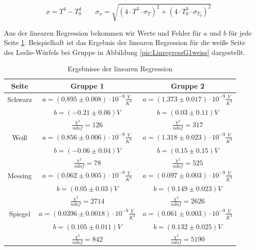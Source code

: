 \documentclass[a4paper, 11pt]{article}
\begin{document}
\begin{equation}
x=T^4-T_0^4
\qquad
\sigma_x = \sqrt{(4 \cdot T^3 \cdot\sigma_T)^2+(4\cdot T_0^3\cdot \sigma_{T_0})^2} 
\end{equation}

Aus der linearen Regression bekommen wir Werte und Fehler für $a$ und $b$ für jede Seite \ref{table:ErgebnisseLinregress}.
Beispielhaft ist das Ergebnis der linearen Regression für die weiße Seite des Leslie-Würfels bei Gruppe in Abbildung \ref{pic:LinregressG1weiss} dargestellt.

\begin{table}[H]
\Large
\centering
	\begin{tabular}{|c|c|c|}
	\hline Seite & Gruppe 1& Gruppe 2 \\
	\hline Schwarz& $a=( 0.895\pm 0.008)\cdot 10^{-9}\frac{V}{K^4} $ &  $a=( 1.373\pm 0.017 )\cdot 10^{-9}\frac{V}{K^4}$\\
	         $ $  & $b=(-0.21 \pm 0.06)V $ &  $b=( 0.03\pm 0.11)V $\\
	$ $  & $\frac{\chi^2}{ndof}=126$ &  $\frac{\chi^2}{ndof}=317$\\
	\hline Weiß& $a=( 0.856\pm 0.006)\cdot 10^{-9}\frac{V}{K^4} $ &  $a=(1.318 \pm 0.023)\cdot 10^{-9}\frac{V}{K^4}$\\
	     $ $       & $b=(-0.06 \pm 0.04)V $ &  $b=(0.15\pm 0.15)V $\\
	$ $  & $\frac{\chi^2}{ndof}=78$ &  $\frac{\chi^2}{ndof}=525$\\
	\hline Messing& $a=(0.062 \pm 0.005)\cdot 10^{-9}\frac{V}{K^4} $ &  $a=( 0.097\pm 0.003)\cdot 10^{-9}\frac{V}{K^4}$\\
	     $ $       & $b=(0.05 \pm 0.03)V $ &  $b=(0.149 \pm 0.023)V $\\
	$ $  & $\frac{\chi^2}{ndof}=2714$ &  $\frac{\chi^2}{ndof}=2626$\\
	\hline Spiegel& $a=(0.0396 \pm 0.0018)\cdot 10^{-9}\frac{V}{K^4} $ &  $a=(0.061\pm 0.003 )\cdot 10^{-9}\frac{V}{K^4}$\\
	     $ $       & $b=(0.105 \pm 0.011)V $ &  $b=(0.132 \pm 0.025 )V $\\
	$ $  & $\frac{\chi^2}{ndof}=842$ &  $\frac{\chi^2}{ndof}=5190$\\
	           
	
	\hline  
	
	\end{tabular}
\caption{Ergebnisse der linearen Regression}
\label{table:ErgebnisseLinregress}
\end{table} 
\end{document}
